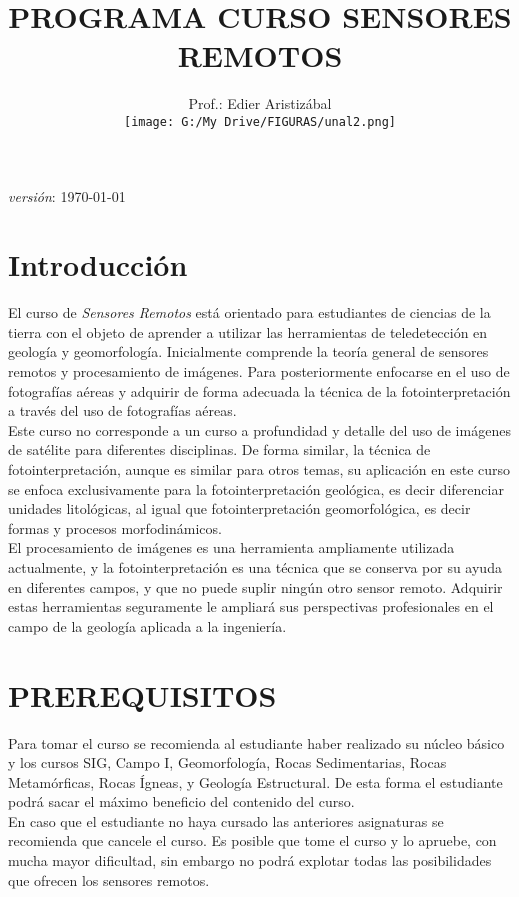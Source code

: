 \documentclass[a4paper,twoside,11pt,]{article}
\title {PROGRAMA  CURSO SENSORES REMOTOS}
\author{Prof.: Edier Aristizábal\\[5ex]
\texttt{[image: G:/My Drive/FIGURAS/unal2.png]}
}
\date{}
\begin{document}
\maketitle

\emph {versión}: \today

\section* {Introducción}
El curso de \emph{Sensores Remotos} está orientado para estudiantes de ciencias de la tierra con el objeto de aprender a utilizar las herramientas de teledetección en geología y geomorfología. Inicialmente comprende la teoría general de sensores remotos y procesamiento de imágenes. Para posteriormente enfocarse en el uso de fotografías aéreas y adquirir de forma adecuada la técnica de la fotointerpretación a través del uso de fotografías aéreas.\\ 
Este curso no corresponde a un curso a profundidad y detalle del uso de imágenes de satélite para diferentes disciplinas. De forma similar, la técnica de fotointerpretación, aunque es similar para otros temas, su aplicación en este curso se enfoca exclusivamente para la fotointerpretación geológica, es decir diferenciar unidades litológicas, al igual que fotointerpretación geomorfológica, es decir formas y procesos morfodinámicos.\\
El procesamiento de imágenes es una herramienta ampliamente utilizada actualmente, y la fotointerpretación es una técnica que se conserva por su ayuda en diferentes campos, y que no puede suplir ningún otro sensor remoto. Adquirir estas herramientas seguramente le ampliará sus perspectivas profesionales en el campo de la geología aplicada a la ingeniería.

\section{PREREQUISITOS}
Para tomar el curso se recomienda al estudiante haber realizado su núcleo básico y los cursos SIG, Campo I, Geomorfología, Rocas Sedimentarias, Rocas Metamórficas, Rocas Ígneas, y Geología Estructural. De esta forma el estudiante podrá sacar el máximo beneficio del contenido del curso.\\
En caso que el estudiante no haya cursado las anteriores asignaturas se recomienda que cancele el curso. Es posible que tome el curso y lo apruebe, con mucha mayor dificultad, sin embargo no podrá explotar todas las posibilidades que ofrecen los sensores remotos.
\end{document}
